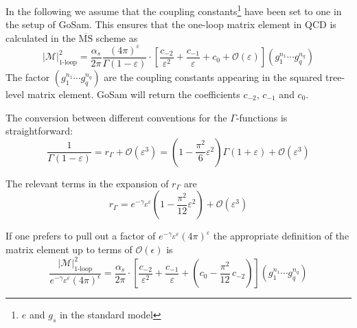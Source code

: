 \documentclass[11pt,a4paper]{refrep}
\newcommand{\gosamversion}{{2{.}0}}
\newcommand{\gosamv}[1][\gosamversion]{{\sc GoSam}\xspace}
\begin{document}
In the following we assume that the coupling constants\footnote{
$e$ and $g_s$ in the standard model} have been set to one in the
setup of \gosamv{}. This ensures that the one-loop matrix
element in QCD is calculated in the $\overline{\mathrm{MS}}$ scheme as
\begin{equation}
\left\vert\mathcal{M}\right\vert^2_{\text{1-loop}}=
\frac{\alpha_s}{2\pi}\frac{(4\pi)^\varepsilon}{\Gamma(1-\varepsilon)}
\cdot\left[\frac{c_{-2}}{\varepsilon^2}+\frac{c_{-1}}{\varepsilon}+c_0
+{\mathcal{O}}(\varepsilon)\right](g_1^{n_1}\cdots g_q^{n_q})
\end{equation}
The factor $(g_1^{n_1}\cdots g_q^{n_q})$ are the coupling constants
appearing in the squared tree-level matrix element. \gosamv{} will
return the coefficients $c_{-2}$, $c_{-1}$ and $c_0$.

The conversion between different conventions for the $\Gamma$-functions
is straightforward:
\begin{equation}
\frac{1}{\Gamma(1-\varepsilon)}=r_\Gamma+{\mathcal O}(\varepsilon^3)=
\left(1-\frac{\pi^2}{6}\varepsilon^2\right)\Gamma(1+\varepsilon)
   +{\mathcal O}(\varepsilon^3)
\end{equation}

The relevant terms in the expansion of $r_\Gamma$ are
\begin{equation}
r_\Gamma=e^{-\gamma_E\varepsilon}
\left(1-\frac{\pi^2}{12}\varepsilon^2\right)+\mathcal{O}(\varepsilon^3)
\end{equation}

If one prefers to pull out a factor of
$e^{-\gamma_E\varepsilon}(4\pi)^{\varepsilon}$ the appropriate
definition of the matrix element up to terms of $\mathcal{O}(\epsilon)$ is
\begin{equation}
\frac{\left\vert\mathcal{M}\right\vert^2_{\text{1-loop}}}%
{e^{-\gamma_E\varepsilon}(4\pi)^\epsilon}=
\frac{\alpha_s}{2\pi}
\cdot\left[\frac{c_{-2}}{\varepsilon^2}+\frac{c_{-1}}{\varepsilon}
+\left(c_0-\frac{\pi^2}{12}\,c_{-2}\right)
\right](g_1^{n_1}\cdots g_q^{n_q})
\end{equation}

\end{document}
